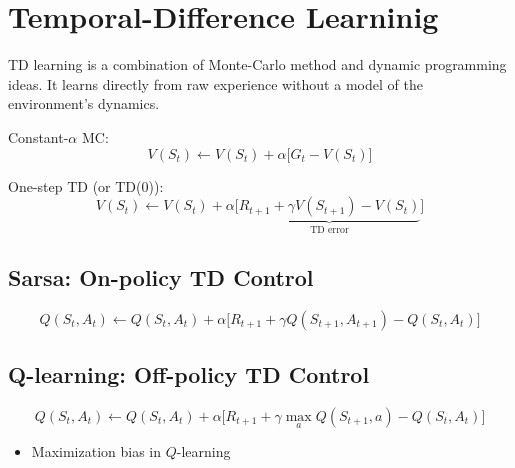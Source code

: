 
\section{Temporal-Difference Learninig}

TD learning is a combination of Monte-Carlo method and dynamic programming ideas. It learns directly from raw experience without a model of the environment's dynamics. 


Constant-$\alpha$ MC:
$$V(S_t) \leftarrow V(S_t)+ \alpha \Big[G_t-V(S_t)\Big] $$

One-step TD (or TD(0)):
$$V(S_t) \leftarrow V(S_t)+ \alpha \Big[\underbrace{R_{t+1}+\gamma V(S_{t+1})-V(S_t)}_{\text{TD error}}\Big] $$

\subsection{Sarsa: On-policy TD Control}
$$Q(S_t, A_t) \leftarrow Q(S_t, A_t)+ \alpha \Big[R_{t+1}+\gamma Q(S_{t+1}, A_{t+1})-Q(S_t, A_t)\Big] $$


\subsection{Q-learning: Off-policy TD Control}

$$Q(S_t, A_t) \leftarrow Q(S_t, A_t)+ \alpha \Big[R_{t+1}+\gamma \max_a Q(S_{t+1}, a)-Q(S_t, A_t)\Big] $$

\begin{itemize}
	\item Maximization bias in $Q$-learning
\end{itemize}


